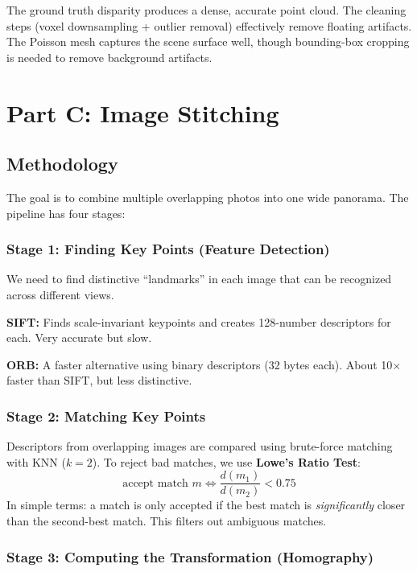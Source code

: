 \documentclass[a4paper,12pt]{article}
\begin{document}
The ground truth disparity produces a dense, accurate point cloud. The cleaning steps (voxel downsampling + outlier removal) effectively remove floating artifacts. The Poisson mesh captures the scene surface well, though bounding-box cropping is needed to remove background artifacts.

\section{Part C: Image Stitching}
\subsection{Methodology}

The goal is to combine multiple overlapping photos into one wide panorama. The pipeline has four stages:

\subsubsection*{Stage 1: Finding Key Points (Feature Detection)}

We need to find distinctive ``landmarks'' in each image that can be recognized across different views.

\textbf{SIFT:} Finds scale-invariant keypoints and creates 128-number descriptors for each. Very accurate but slow.

\textbf{ORB:} A faster alternative using binary descriptors (32 bytes each). About 10$\times$ faster than SIFT, but less distinctive.

\subsubsection*{Stage 2: Matching Key Points}

Descriptors from overlapping images are compared using brute-force matching with KNN ($k=2$). To reject bad matches, we use \textbf{Lowe's Ratio Test}:
\[
    \text{accept match } m \iff \frac{d(m_1)}{d(m_2)} < 0.75
\]
In simple terms: a match is only accepted if the best match is \textit{significantly} closer than the second-best match. This filters out ambiguous matches.

\subsubsection*{Stage 3: Computing the Transformation (Homography)}
\end{document}
